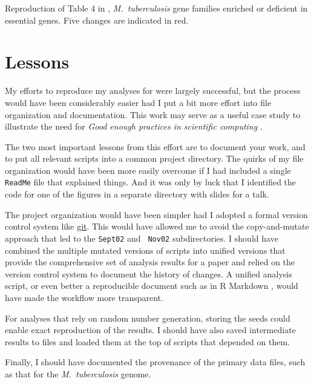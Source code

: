 \begin{table}
\caption{Reproduction of Table 4 in \citet{lamichhane2003},
\emph{M.\ tuberculosis\/} gene families enriched or deficient in
essential genes. Five changes are indicated in red.\label{tab:tab4}}

\centering
\small

\end{table}





\section{Lessons}


My efforts to reproduce my analyses for \citet{lamichhane2003} were
largely successful, but the process would have been considerably
easier had I put a bit more effort into file organization and
documentation. This work may serve as a useful case study to
illustrate the need for \emph{Good enough practices in scientific
computing} \citep{wilson2017}.

The two most important lessons from this effort are to document your
work, and to put all relevant scripts into a common project directory.
The quirks of my file organization would have been more easily
overcome if I had included a single {\tt ReadMe} file that explained
things. And it was only by luck that I identified the code for one of
the figures in a separate directory with slides for a talk.

The project organization would have been simpler had I
adopted a formal version control system like
\href{https://git-scm.com}{git}. This would have allowed me to avoid
the copy-and-mutate approach that led to the {\tt Sept02} and {\tt
Nov02} subdirectories. I should have combined the multiple mutated
versions of scripts into unified versions that provide the
comprehensive set of analysis results for a paper and relied on the
version control system to document the history of changes. A unified
analysis script, or even better a reproducible document such as in R
Markdown \citep{rmarkdown-book,rmarkdown-pkg}, would have made the
workflow more transparent.

For analyses that rely on random number generation, storing the seeds
could enable exact reproduction of the results. I should have also
saved intermediate results to files and loaded them at the top of
scripts that depended on them.

Finally, I should have documented the provenance of the primary data
files, such as that for the \emph{M.\ tuberculosis\/} genome.
